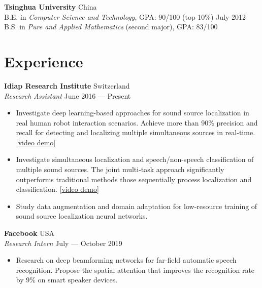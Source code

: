 \documentclass[a4paper,9pt]{article} %
\newcommand{\ind}{\hspace*{1em}}
\begin{document}
\textbf{Tsinghua University} \hfill China \\
\ind{} B.E. in \textit{Computer Science and Technology}, GPA\@: 90/100 (top 10\%) \hfill July 2012 \\
\ind{} B.S. in \textit{Pure and Applied Mathematics} (second major), GPA\@: 83/100 %


\section{Experience}

\textbf{Idiap Research Institute}  \hfill Switzerland \\
\textit{Research Assistant} \hfill June 2016 --- Present%
\vspace{-.9\parskip}
\begin{itemize}
  \item Investigate deep learning-based approaches for sound source localization in real human robot interaction scenarios.
        Achieve more than 90\% precision and recall for detecting and localizing multiple simultaneous sources in real-time.
        [\href{https://www.youtube.com/watch?v=_4EwuVlE_pU}{video demo}]
  \item Investigate simultaneous localization and speech/non-speech classification of multiple sound sources.
        The joint multi-task approach significantly outperforms traditional methods those sequentially process localization and classification.
        [\href{https://www.youtube.com/watch?v=O7bQvg03RTc}{video demo}]
  \item Study data augmentation and domain adaptation for low-resource training of sound source localization neural networks.
\end{itemize}


\textbf{Facebook}  \hfill USA \\
\textit{Research Intern} \hfill July --- October 2019%
\vspace{-.9\parskip}
\begin{itemize}
  \item Research on deep beamforming networks for far-field automatic speech recognition.
        Propose the spatial attention that improves the recognition rate by 9\% on smart speaker devices.
\end{itemize}
\end{document}
